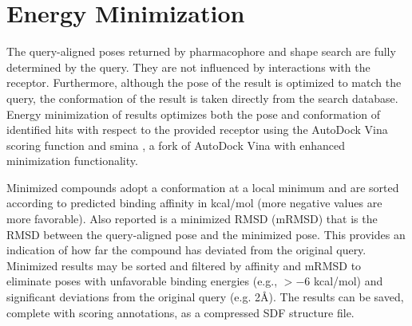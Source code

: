 \section{Energy Minimization}

The query-aligned poses returned by pharmacophore and shape search are fully determined by the query. They are not influenced by interactions with the receptor.  Furthermore, although the pose of the result is optimized to match the query, the conformation of the result is taken directly from the search database.  Energy minimization of results optimizes both the pose and conformation of identified hits with respect to the provided receptor using the AutoDock Vina \cite{Trott_2009} scoring function and smina \cite{smina}, a fork of AutoDock Vina with enhanced minimization functionality. 

Minimized compounds adopt a conformation at a local minimum and are sorted according to predicted binding affinity in kcal/mol (more negative values are more favorable).  Also reported is a minimized RMSD (mRMSD) that is the RMSD between the query-aligned pose and the minimized pose.  This provides an indication of how far the compound has deviated from the original query.  Minimized results may be sorted and filtered by affinity and mRMSD to eliminate poses with unfavorable binding energies (e.g., $>-6$ kcal/mol) and significant deviations from the original query (e.g. 2{\AA}). The results can be saved, complete with scoring annotations, as a compressed SDF structure file.